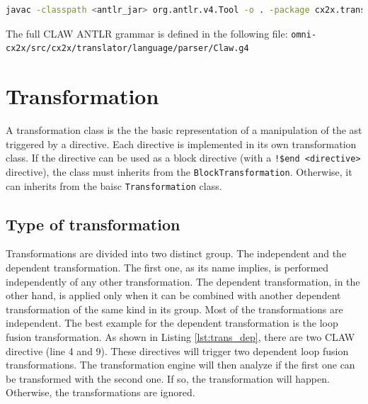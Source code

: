 \documentclass[a4paper, 11pt]{report}
\begin{document}
\begin{lstlisting}[label=lst:antlr_cmd, caption=ANTLR parser generation command, language=bash]
javac -classpath <antlr_jar> org.antlr.v4.Tool -o . -package cx2x.translator.language.parser Claw.g4
\end{lstlisting}

The full CLAW ANTLR grammar is defined in the following file: \lstinline|omni-cx2x/src/cx2x/translator/language/parser/Claw.g4|

\chapter{Transformation}
\label{chapter:transformation}
A transformation class is the the basic representation of a manipulation of the \gls{ast} triggered by a directive. Each directive is implemented in its own transformation class. If the directive can be used as a block directive (with a \lstinline|!$end <directive>| directive), the class must inherits from the \lstinline!BlockTransformation!. Otherwise, it can inherits from the baisc \lstinline!Transformation! class.

\section{Type of transformation}
Transformations are divided into two distinct group. The independent and the dependent transformation. The first one, as its name implies, is performed independently of any other transformation. The dependent transformation, in the other hand, is applied only when it can be combined with another dependent transformation of the same kind in its group. Most of the transformations are independent. The best example for the dependent transformation is the loop fusion transformation. As shown in Listing \ref{lst:trans_dep}, there are two CLAW directive (line 4 and 9). These directives will trigger two dependent loop fusion transformations. The transformation engine will then analyze if the first one can be transformed with the second one. If so, the transformation will happen. Otherwise, the transformations are ignored.


\end{document}
